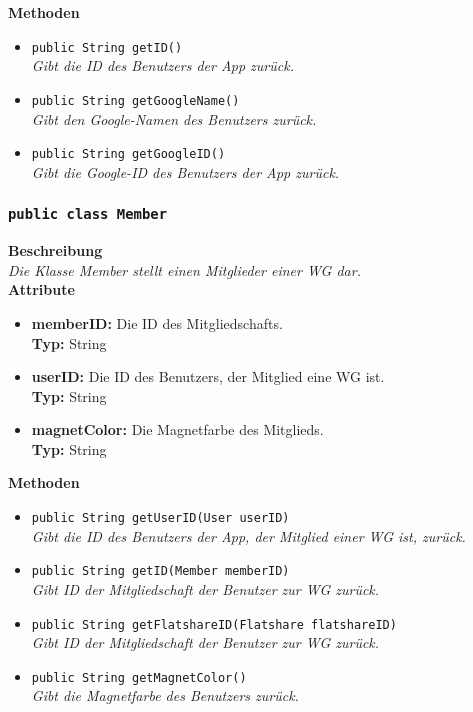	\textbf{Methoden}
	\begin{itemize}
	\item{\texttt{public String getID()}}\\
	\textit{Gibt die ID des Benutzers der App zurück.}\\
	\item{\texttt{public String getGoogleName()}}\\
	\textit{Gibt den Google-Namen des Benutzers zurück.}\\
	
	\item{\texttt{public String getGoogleID()}}\\
	\textit{Gibt die Google-ID des Benutzers der App zurück.}\\
	\end{itemize}

	

\subsubsection{\texttt{public class Member}}

	\textbf{Beschreibung} \\
	\textit{Die Klasse Member stellt einen Mitglieder einer WG dar.} \\
	
	\textbf{Attribute}
	\begin{itemize}
		\item \textbf{memberID:} Die ID des Mitgliedschafts. \\
		\textbf{Typ:} String
		\item \textbf{userID:} Die ID des Benutzers, der Mitglied eine WG ist. \\
		\textbf{Typ:} String
		\item \textbf{magnetColor:} Die Magnetfarbe des Mitglieds. \\
		\textbf{Typ:} String
	\end{itemize}

	\textbf{Methoden}
	\begin{itemize}
		\item\texttt{{public String getUserID(User userID)}}\\
		\textit{Gibt die ID des Benutzers der App, der Mitglied einer WG ist, zurück.}\\
		
		\item\texttt{{public String getID(Member memberID)}}\\
		\textit{Gibt ID der Mitgliedschaft der Benutzer zur WG zurück.}\\
		
		\item\texttt{{public String getFlatshareID(Flatshare flatshareID)}}\\
		\textit{Gibt ID der Mitgliedschaft der Benutzer zur WG zurück.}\\
		
		\item\texttt{{public String getMagnetColor()}}\\
		\textit{Gibt die Magnetfarbe des Benutzers zurück.}\\
	\end{itemize}       

